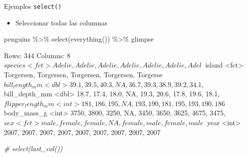 \documentclass[
  ignorenonframetext,
  aspectratio=169]{beamer}
\newenvironment{Shaded}{\begin{snugshade}}{\end{snugshade}}
\newcommand{\CommentTok}[1]{\textcolor[rgb]{0.56,0.35,0.01}{\textit{#1}}}
\newcommand{\FunctionTok}[1]{\textcolor[rgb]{0.00,0.00,0.00}{#1}}
\newcommand{\NormalTok}[1]{#1}
\newcommand{\SpecialCharTok}[1]{\textcolor[rgb]{0.00,0.00,0.00}{#1}}
\providecommand{\tightlist}{%
  \setlength{\itemsep}{0pt}\setlength{\parskip}{0pt}}
\let\oldverbatim\verbatim
\let\endoldverbatim\endverbatim
\renewenvironment{verbatim}{\tiny\oldverbatim}{\endoldverbatim}
\begin{document}

\begin{frame}[fragile]{Ejemplos \texttt{select()}}
\protect\hypertarget{ejemplos-select-2}{}
\begin{itemize}
\tightlist
\item
  Seleccionar todas las columnas
\end{itemize}

\begin{Shaded}
\begin{Highlighting}[]
\NormalTok{penguins }\SpecialCharTok{\%\textgreater{}\%} 
  \FunctionTok{select}\NormalTok{(}\FunctionTok{everything}\NormalTok{()) }\SpecialCharTok{\%\textgreater{}\%} 
\NormalTok{  glimpse}
\end{Highlighting}
\end{Shaded}

\begin{verbatim}
Rows: 344
Columns: 8
$ species           <fct> Adelie, Adelie, Adelie, Adelie, Adelie, Adelie, Adel~
$ island            <fct> Torgersen, Torgersen, Torgersen, Torgersen, Torgerse~
$ bill_length_mm    <dbl> 39.1, 39.5, 40.3, NA, 36.7, 39.3, 38.9, 39.2, 34.1, ~
$ bill_depth_mm     <dbl> 18.7, 17.4, 18.0, NA, 19.3, 20.6, 17.8, 19.6, 18.1, ~
$ flipper_length_mm <int> 181, 186, 195, NA, 193, 190, 181, 195, 193, 190, 186~
$ body_mass_g       <int> 3750, 3800, 3250, NA, 3450, 3650, 3625, 4675, 3475, ~
$ sex               <fct> male, female, female, NA, female, male, female, male~
$ year              <int> 2007, 2007, 2007, 2007, 2007, 2007, 2007, 2007, 2007~
\end{verbatim}

\begin{Shaded}
\begin{Highlighting}[]
\CommentTok{\# select(last\_col())}
\end{Highlighting}
\end{Shaded}
\end{frame}
\end{document}
